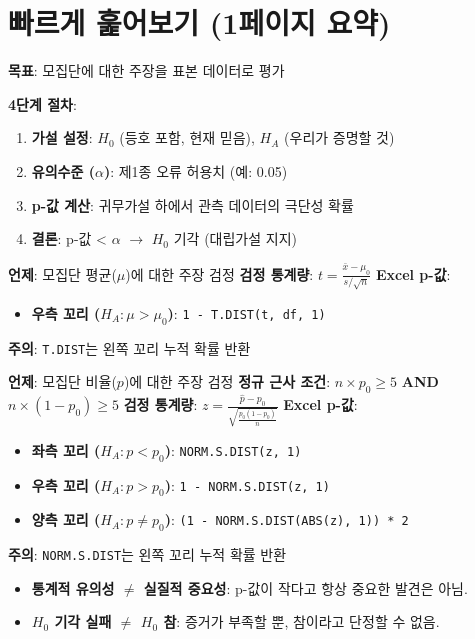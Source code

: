\documentclass[11pt,a4paper]{article}
\begin{document}
\newpage
\section*{빠르게 훑어보기 (1페이지 요약)}

\begin{tcolorbox}[colback=myblue!5!white, colframe=myblue!75!black, title=\textbf{가설 검정 핵심 요약}]
\textbf{목표}: 모집단에 대한 주장을 표본 데이터로 평가

\textbf{4단계 절차}:
\begin{enumerate}
    \item \textbf{가설 설정}: $H_0$ (등호 포함, 현재 믿음), $H_A$ (우리가 증명할 것)
    \item \textbf{유의수준 ($\alpha$)}: 제1종 오류 허용치 (예: 0.05)
    \item \textbf{p-값 계산}: 귀무가설 하에서 관측 데이터의 극단성 확률
    \item \textbf{결론}: p-값 < $\alpha$ $\rightarrow$ $H_0$ 기각 (대립가설 지지)
\end{enumerate}
\end{tcolorbox}

\begin{tcolorbox}[colback=mygreen!5!white, colframe=mygreen!75!black, title=\textbf{평균 검정 (t-검정)}]
\textbf{언제}: 모집단 평균($\mu$)에 대한 주장 검정
\textbf{검정 통계량}: $t = \frac{\bar{x} - \mu_0}{s/\sqrt{n}}$
\textbf{Excel p-값}:
\begin{itemize}
    \item \textbf{우측 꼬리 ($H_A: \mu > \mu_0$)}: \texttt{1 - T.DIST(t, df, 1)}
\end{itemize}
\textbf{주의}: \texttt{T.DIST}는 왼쪽 꼬리 누적 확률 반환
\end{tcolorbox}

\begin{tcolorbox}[colback=mygreen!5!white, colframe=mygreen!75!black, title=\textbf{비율 검정 (z-검정)}]
\textbf{언제}: 모집단 비율($p$)에 대한 주장 검정
\textbf{정규 근사 조건}: $n \times p_0 \ge 5$ \textbf{AND} $n \times (1 - p_0) \ge 5$
\textbf{검정 통계량}: $z = \frac{\hat{p} - p_0}{\sqrt{\frac{p_0(1-p_0)}{n}}}$
\textbf{Excel p-값}:
\begin{itemize}
    \item \textbf{좌측 꼬리 ($H_A: p < p_0$)}: \texttt{NORM.S.DIST(z, 1)}
    \item \textbf{우측 꼬리 ($H_A: p > p_0$)}: \texttt{1 - NORM.S.DIST(z, 1)}
    \item \textbf{양측 꼬리 ($H_A: p \ne p_0$)}: \texttt{(1 - NORM.S.DIST(ABS(z), 1)) * 2}
\end{itemize}
\textbf{주의}: \texttt{NORM.S.DIST}는 왼쪽 꼬리 누적 확률 반환
\end{tcolorbox}

\begin{tcolorbox}[colback=myred!5!white, colframe=myred!75!black, title=\textbf{중요한 오해}]
\begin{itemize}
    \item \textbf{통계적 유의성 $\ne$ 실질적 중요성}: p-값이 작다고 항상 중요한 발견은 아님.
    \item \textbf{$H_0$ 기각 실패 $\ne$ $H_0$ 참}: 증거가 부족할 뿐, 참이라고 단정할 수 없음.
\end{itemize}
\end{tcolorbox}
\end{document}
